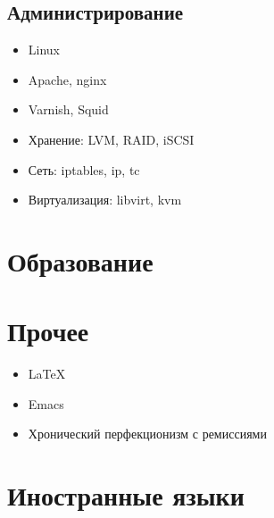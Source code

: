 \documentclass[11pt,a4paper,sans]{moderncv}        %
\begin{document}
\subsection{Администрирование}

\begin{itemize}
\item Linux
\item Apache, nginx
\item Varnish, Squid
\item Хранение: LVM, RAID, iSCSI
\item Сеть: iptables, ip, tc
\item Виртуализация: libvirt, kvm
\end{itemize}

\section{Образование}


\section{Прочее}

\begin{itemize}
\item \LaTeX
\item Emacs
\item Хронический перфекционизм с ремиссиями
\end{itemize}

\section{Иностранные языки}


\nocite{*}

\end{document}
